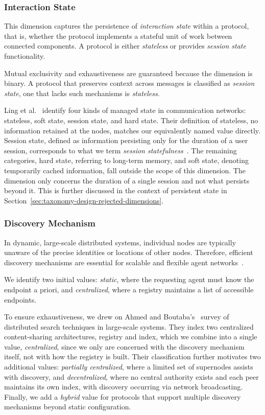 \documentclass[pdflatex,sn-mathphys-num]{sn-jnl}%
\theoremstyle{thmstyleone}%
\theoremstyle{thmstyletwo}%
\theoremstyle{thmstylethree}%
\begin{document}
\subsubsection{Interaction State}

This dimension captures the persistence of \textit{interaction state} within a protocol, that is, whether the protocol implements a stateful unit of work between connected components. A protocol is either \textit{stateless} or provides \textit{session state} functionality.

Mutual exclusivity and exhaustiveness are guaranteed because the dimension is binary. A protocol that preserves context across messages is classified as \textit{session state}, one that lacks such mechanisms is \textit{stateless}.

Ling et al.~\cite{ling2004session} identify four kinds of managed state in communication networks: stateless, soft state, session state, and hard state. Their definition of stateless, no information retained at the nodes, matches our equivalently named value directly. Session state, defined as information persisting only for the duration of a user session, corresponds to what we term \textit{session statefulness}~\cite{ling2004session}. The remaining categories, hard state, referring to long-term memory, and soft state, denoting temporarily cached information, fall outside the scope of this dimension. The dimension only concerns the duration of a single session and not what persists beyond it. This is further discussed in the context of persistent state in Section~\ref{sec:taxonomy-design-rejected-dimensions}.

\subsubsection{Discovery Mechanism}

In dynamic, large-scale distributed systems, individual nodes are typically unaware of the precise identities or locations of other nodes. Therefore, efficient discovery mechanisms are essential for scalable and flexible agent networks~\cite{ahmed2010survey,yang2025survey}.

We identify two initial values: \textit{static}, where the requesting agent must know the endpoint a priori, and \textit{centralized}, where a registry maintains a list of accessible endpoints.

To ensure exhaustiveness, we drew on Ahmed and Boutaba's~\cite{ahmed2010survey} survey of distributed search techniques in large-scale systems. They index two centralized content-sharing architectures, registry and index, which we combine into a single value, \textit{centralized}, since we only are concerned with the discovery mechanism itself, not with how the registry is built. Their classification further motivates two additional values: \textit{partially centralized}, where a limited set of supernodes assists with discovery, and \textit{decentralized}, where no central authority exists and each peer maintains its own index, with discovery occurring via network broadcasting. Finally, we add a \textit{hybrid} value for protocols that support multiple discovery mechanisms beyond static configuration.
\end{document}
